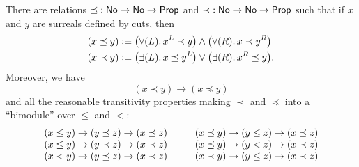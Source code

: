 \begin{thm}\label{defn:No-codes}
  There are relations $\mathord\preceq:\mathsf{No}\to\mathsf{No}\to\mathsf{Prop}$ and $\mathord\prec:\mathsf{No}\to\mathsf{No}\to\mathsf{Prop}$ such that if $x$ and $y$ are surreals defined by cuts, then
  \begin{align*}
    (x\preceq y) &\defeq
    \big(\fall{L} x^L\prec y\big) \land \big(\fall{R} x\prec y^R\big)\\
    (x\prec y) &\defeq
    \big(\exis{L} x\preceq y^L\big) \lor \big(\exis{R} x^R \preceq y\big).
  \end{align*}
  Moreover, we have
  \begin{equation}\label{eq:NO-codes-unstrict}
    (x\prec y) \to (x\preceq y)
  \end{equation}
  and all the reasonable transitivity properties making $\prec$ and $\preceq$ into a ``bimodule'' over $\le$ and $<$:
  \begin{equation}\label{eq:NO-codes-transitivity}
    \begin{array}{c@{\hspace{1cm}}c}
      (x \le y) \to (y\preceq z) \to (x\preceq z) &
      (x \preceq y) \to (y\le z) \to (x\preceq z) \\
      (x \le y) \to (y\prec z) \to (x\prec z) &
      (x \preceq y) \to (y< z) \to (x\prec z) \\
      (x < y) \to (y\preceq z) \to (x\prec z) &
      (x \prec y) \to (y\le z) \to (x\prec z) %
  \end{array}
  \end{equation}
\end{thm}

